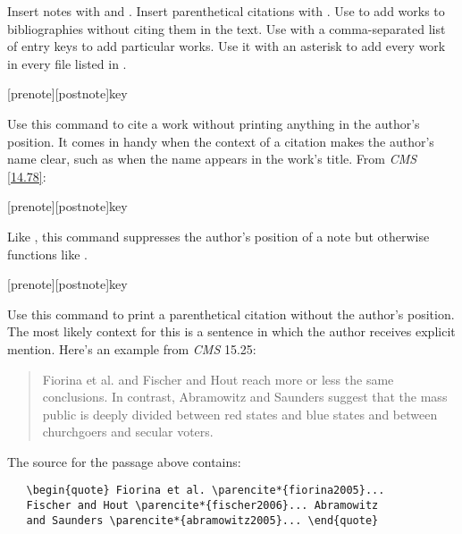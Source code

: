 \documentclass[11pt,letterpaper,oneside]{article}
\begin{document}
\noindent Insert notes with  and . Insert
parenthetical citations with . Use  to add
works to bibliographies without citing them in the text. Use
 with a comma-separated list of entry keys to add
particular works. Use it with an asterisk to add every work in every
 file listed in .

\begin{ltxsyntax}

[prenote][postnote]{key}

Use this command to cite a work without printing anything in the
author's position. It comes in handy when the context of a citation
makes the author's name clear, such as when the name appears in the
work's title. From \textit{CMS} \ref{14.78}:

\begin{citebib}
\item \cite*[233]{franklin1868}
\item \cite*[234]{franklin1868}
\end{citebib}

[prenote][postnote]{key}

Like , this command suppresses the author's position of a
note but otherwise functions like .

[prenote][postnote]{key}

Use this command to print a parenthetical citation without the
author's position. The most likely context for this is a sentence in
which the author receives explicit mention. Here's an example from
\textit{CMS} 15.25:

\begin{quote} Fiorina et al. \parencite*{fiorina2005} and Fischer and
Hout \parencite*{fischer2006} reach more or less the same conclusions.
In contrast, Abramowitz and Saunders \parencite*{abramowitz2005}
suggest that the mass public is deeply divided between red states and
blue states and between churchgoers and secular voters. \end{quote}

The source for the passage above contains:

\begin{verbatim}
   \begin{quote} Fiorina et al. \parencite*{fiorina2005}...
   Fischer and Hout \parencite*{fischer2006}... Abramowitz
   and Saunders \parencite*{abramowitz2005}... \end{quote}
\end{verbatim}


\end{ltxsyntax}
\end{document}
